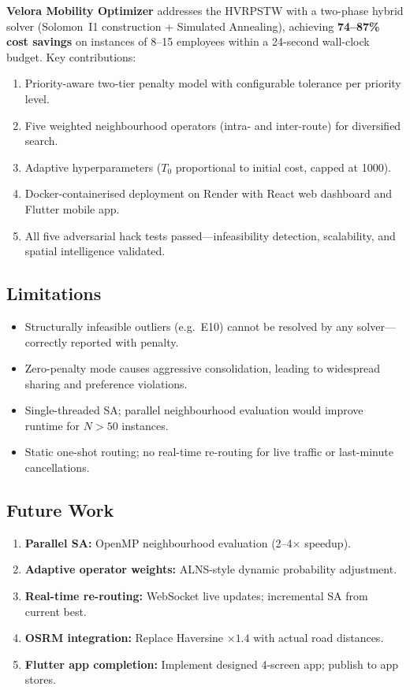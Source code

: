 \documentclass[11pt,a4paper]{article}
\begin{document}
\textbf{Velora Mobility Optimizer} addresses the HVRPSTW with a two-phase hybrid solver (Solomon~I1 construction + Simulated Annealing), achieving \textbf{74--87\% cost savings} on instances of 8--15 employees within a 24-second wall-clock budget. Key contributions:
\begin{enumerate}[nosep, leftmargin=1.2em]
    \item Priority-aware two-tier penalty model with configurable tolerance per priority level.
    \item Five weighted neighbourhood operators (intra- and inter-route) for diversified search.
    \item Adaptive hyperparameters ($T_0$ proportional to initial cost, capped at 1000).
    \item Docker-containerised deployment on Render with React web dashboard and Flutter mobile app.
    \item All five adversarial hack tests passed---infeasibility detection, scalability, and spatial intelligence validated.
\end{enumerate}

\subsection{Limitations}

\begin{itemize}[nosep, leftmargin=1.2em]
    \item Structurally infeasible outliers (e.g.\ E10) cannot be resolved by any solver---correctly reported with penalty.
    \item Zero-penalty mode causes aggressive consolidation, leading to widespread sharing and preference violations.
    \item Single-threaded SA; parallel neighbourhood evaluation would improve runtime for $N > 50$ instances.
    \item Static one-shot routing; no real-time re-routing for live traffic or last-minute cancellations.
\end{itemize}

\subsection{Future Work}

\begin{recbox}
\begin{enumerate}[nosep, leftmargin=1.2em]
    \item \textbf{Parallel SA:} OpenMP neighbourhood evaluation (2--4$\times$ speedup).
    \item \textbf{Adaptive operator weights:} ALNS-style dynamic probability adjustment.
    \item \textbf{Real-time re-routing:} WebSocket live updates; incremental SA from current best.
    \item \textbf{OSRM integration:} Replace Haversine $\times 1.4$ with actual road distances.
    \item \textbf{Flutter app completion:} Implement designed 4-screen app; publish to app stores.
\end{enumerate}
\end{recbox}
\end{document}
